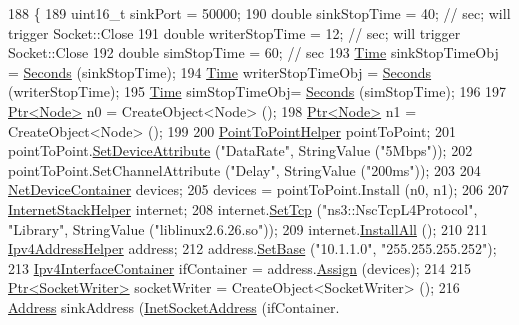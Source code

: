 \begin{DoxyCode}
188 \{
189   uint16\_t sinkPort = 50000;
190   \textcolor{keywordtype}{double} sinkStopTime = 40;  \textcolor{comment}{// sec; will trigger Socket::Close}
191   \textcolor{keywordtype}{double} writerStopTime = 12;  \textcolor{comment}{// sec; will trigger Socket::Close}
192   \textcolor{keywordtype}{double} simStopTime = 60;  \textcolor{comment}{// sec}
193   \hyperlink{classns3_1_1Time}{Time} sinkStopTimeObj = \hyperlink{group__timecivil_ga33c34b816f8ff6628e33d5c8e9713b9e}{Seconds} (sinkStopTime);
194   \hyperlink{classns3_1_1Time}{Time} writerStopTimeObj = \hyperlink{group__timecivil_ga33c34b816f8ff6628e33d5c8e9713b9e}{Seconds} (writerStopTime);
195   \hyperlink{classns3_1_1Time}{Time} simStopTimeObj= \hyperlink{group__timecivil_ga33c34b816f8ff6628e33d5c8e9713b9e}{Seconds} (simStopTime);
196 
197   \hyperlink{classns3_1_1Ptr}{Ptr<Node>} n0 = CreateObject<Node> ();
198   \hyperlink{classns3_1_1Ptr}{Ptr<Node>} n1 = CreateObject<Node> ();
199 
200   \hyperlink{classns3_1_1PointToPointHelper}{PointToPointHelper} pointToPoint;
201   pointToPoint.\hyperlink{classns3_1_1PointToPointHelper_a4577f5ab8c387e5528af2e0fbab1152e}{SetDeviceAttribute} (\textcolor{stringliteral}{"DataRate"}, StringValue (\textcolor{stringliteral}{"5Mbps"}));
202   pointToPoint.SetChannelAttribute (\textcolor{stringliteral}{"Delay"}, StringValue (\textcolor{stringliteral}{"200ms"}));
203 
204   \hyperlink{classns3_1_1NetDeviceContainer}{NetDeviceContainer} devices;
205   devices = pointToPoint.Install (n0, n1);
206 
207   \hyperlink{classns3_1_1InternetStackHelper}{InternetStackHelper} internet;
208   internet.\hyperlink{classns3_1_1InternetStackHelper_ac76e9cf493ef559f311c4ef85945129f}{SetTcp} (\textcolor{stringliteral}{"ns3::NscTcpL4Protocol"}, \textcolor{stringliteral}{"Library"}, StringValue (\textcolor{stringliteral}{"liblinux2.6.26.so"}));
209   internet.\hyperlink{classns3_1_1InternetStackHelper_a6cfa73782fd4071c4cfbd73ebf1bbb44}{InstallAll} ();
210 
211   \hyperlink{classns3_1_1Ipv4AddressHelper}{Ipv4AddressHelper} address;
212   address.\hyperlink{classns3_1_1Ipv4AddressHelper_acf7b16dd25bac67e00f5e25f90a9a035}{SetBase} (\textcolor{stringliteral}{"10.1.1.0"}, \textcolor{stringliteral}{"255.255.255.252"});
213   \hyperlink{classns3_1_1Ipv4InterfaceContainer}{Ipv4InterfaceContainer} ifContainer = address.\hyperlink{classns3_1_1Ipv4AddressHelper_af8e7f4a1a7e74c00014a1eac445a27af}{Assign} (devices);
214 
215   \hyperlink{classns3_1_1Ptr}{Ptr<SocketWriter>} socketWriter = CreateObject<SocketWriter> ();
216   \hyperlink{classns3_1_1Address}{Address} sinkAddress (\hyperlink{classns3_1_1InetSocketAddress}{InetSocketAddress} (ifContainer.

\end{DoxyCode}
